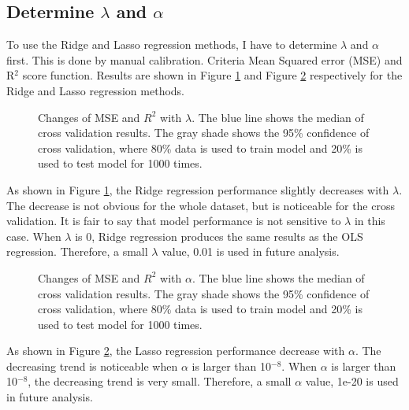 \documentclass[a4paper]{article}
\begin{document}
\subsection{Determine $\lambda$ and $\alpha$}
To use the Ridge and Lasso regression methods, I have to determine $\lambda$ and $\alpha$ first. This is done by manual calibration. Criteria Mean Squared error (MSE) and R$^{2}$ score function. Results are shown in Figure \ref{figRidgeLambda} and Figure \ref{figLassoAlpha} respectively for the Ridge and Lasso regression methods.
\begin{figure}[htbp]
    \centering
   \caption{Changes of MSE and $R^2$ with $\lambda$. The blue line shows the median of cross validation results. The gray shade shows the 95\% confidence of cross validation, where 80\% data is used to train model and 20\% is used to test model for 1000 times.}
   \label{figRidgeLambda}
\end{figure}
\newline\newline
As shown in Figure \ref{figRidgeLambda}, the Ridge regression performance slightly decreases with $\lambda$. The decrease is not obvious for the whole dataset, but is noticeable for the cross validation. It is fair to say that model performance is not sensitive to $\lambda$ in this case. When $\lambda$ is 0, Ridge regression produces the same results as the OLS regression. Therefore, a small $\lambda$ value, 0.01 is used in future analysis.
\begin{figure}[htbp]
    \centering
   \caption{Changes of MSE and $R^2$ with $\alpha$. The blue line shows the median of cross validation results. The gray shade shows the 95\% confidence of cross validation, where 80\% data is used to train model and 20\% is used to test model for 1000 times.}
   \label{figLassoAlpha}
\end{figure}
\newline\newline
As shown in Figure \ref{figLassoAlpha}, the Lasso regression performance decrease with $\alpha$. The decreasing trend is noticeable when $\alpha$ is larger than 10$^{-8}$. When $\alpha$ is larger than 10$^{-8}$, the decreasing trend is very small. Therefore, a small $\alpha$ value, 1e-20 is used in future analysis.
\end{document}
